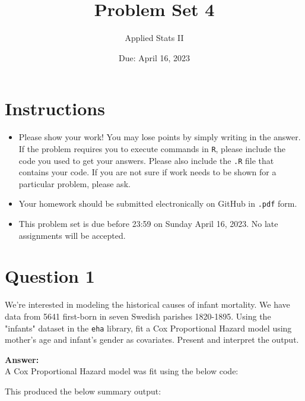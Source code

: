 \documentclass[12pt,letterpaper]{article}
\title{Problem Set 4}
\date{Due: April 16, 2023}
\author{Applied Stats II}
\begin{document}
	\maketitle
	\section*{Instructions}
	\begin{itemize}
	\item Please show your work! You may lose points by simply writing in the answer. If the problem requires you to execute commands in \texttt{R}, please include the code you used to get your answers. Please also include the \texttt{.R} file that contains your code. If you are not sure if work needs to be shown for a particular problem, please ask.
	\item Your homework should be submitted electronically on GitHub in \texttt{.pdf} form.
	\item This problem set is due before 23:59 on Sunday April 16, 2023. No late assignments will be accepted.

	\end{itemize}

	\vspace{.25cm}
\section*{Question 1}
\vspace{.25cm}
\noindent We're interested in modeling the historical causes of infant mortality. We have data from 5641 first-born in seven Swedish parishes 1820-1895. Using the "infants" dataset in the \texttt{eha} library, fit a Cox Proportional Hazard model using mother's age and infant's gender as covariates. Present and interpret the output.

\vspace{.5cm}
\textbf{Answer:}\\

A Cox Proportional Hazard model was fit using the below code:

\vspace{.5cm}
   
\vspace{.5cm}

This produced the below summary output:
\end{document}
